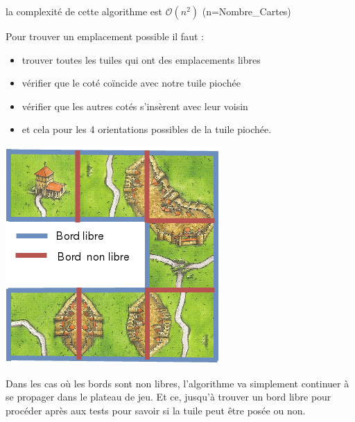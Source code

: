 la complexité de cette algorithme est $\mathcal{O}(n^2)$ (n=Nombre\_Cartes)

Pour trouver un emplacement possible il faut :
\begin{itemize}
    \item trouver toutes les tuiles qui ont des emplacements libres
    \item vérifier que le coté coïncide avec notre tuile piochée
    \item vérifier que les autres cotés s'insèrent avec leur voisin
    \item et cela pour les 4 orientations possibles de la tuile piochée.
\end{itemize}

\vspace{0.5cm}

\begin{minipage}{0.5\linewidth}
\includegraphics[scale=0.5]{BordLibre.png}
\end{minipage}\hfill
\begin{minipage}{0.5\linewidth}
Dans les cas où les bords sont non libres, l'algorithme va simplement continuer à se propager dans le plateau de jeu. Et ce, jusqu'à trouver un bord libre pour procéder après aux tests pour savoir si la tuile peut être posée ou non.
\end{minipage}

